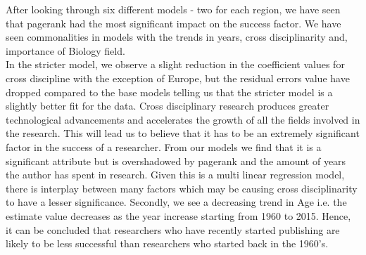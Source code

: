 \documentclass[a4paper,11pt]{article}
\theoremstyle{mytheor}
\begin{document}
After looking through six different models - two for each region, we have seen that pagerank had the most significant impact on the success factor. We have seen commonalities in models with the trends in years, cross disciplinarity and, importance of Biology field. \\
In the stricter model, we observe a slight reduction in the coefficient values for cross discipline with the exception of Europe, but the residual errors value have dropped compared to the base models telling us that the stricter model is a slightly better fit for the data. Cross disciplinary research produces greater technological advancements and accelerates the growth of all the fields involved in the research. This will lead us to believe that it has to be an extremely significant factor in the success of a researcher. From our models we find that it is a significant attribute but is overshadowed by pagerank and the amount of years the author has spent in research. Given this is a multi linear regression model, there is interplay between many factors which may be causing cross disciplinarity to have a lesser significance.
\newline
Secondly, we see a decreasing trend in Age i.e. the estimate value decreases as the year increase starting from 1960 to 2015. Hence, it can be concluded that researchers who have recently started publishing are likely to be less successful than researchers who started back in the 1960's.
\end{document}
